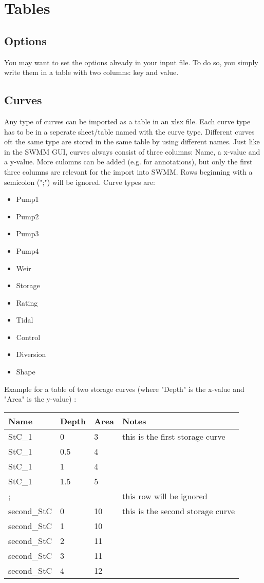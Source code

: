 \documentclass[10pt,a4paper,oneside]{scrbook}
\begin{document}
\section{Tables}

\subsection{Options}
You may want to set the options already in your input file. To do so, you simply write them in a table with two columns: key and value. \newline


\subsection{Curves}
Any type of curves can be imported as a table in an xlsx file. Each curve type has to be in a seperate sheet/table named with the curve type. Different curves oft the same type are stored in the same table by using different names. Just like in the SWMM GUI, curves always consist of three columns: Name, a x-value and a y-value. More culomns can be added (e.g. for annotations), but only the first three columns are relevant for the import into SWMM. Rows beginning with a semicolon (";") will be ignored. Curve types are:
\begin{itemize}
	\setlength\itemsep{0pt}
	\item Pump1
	\item Pump2
	\item Pump3
	\item Pump4
	\item Weir
	\item Storage
	\item Rating
	\item Tidal
	\item Control
	\item Diversion
	\item Shape
\end{itemize}
Example for a table of two storage curves (where "Depth" is the x-value and "Area" is the y-value) :\\
\begin{tabular}{|p{1.7cm}|p{1.3cm}|P{1.3cm}|P{6cm}|}
\hline 
\textbf{Name} & \textbf{Depth} & \textbf{Area} & \textbf{Notes}\\ 
\hline 
StC\_1 & 0 & 3 & this is the first storage curve\\
\hline 
StC\_1 & 0.5 & 4 & \\
\hline 
StC\_1 & 1 & 4 & \\
\hline 
StC\_1 & 1.5 & 5 & \\
\hline 
; &  &  & this row will be ignored\\
\hline 
second\_StC & 0 & 10 & this is the second storage curve\\
\hline 
second\_StC & 1 & 10 & \\
\hline 
second\_StC & 2 & 11 & \\
\hline 
second\_StC & 3 & 11 & \\
\hline 
second\_StC & 4 & 12 & \\
\hline 
\end{tabular}
\end{document}
